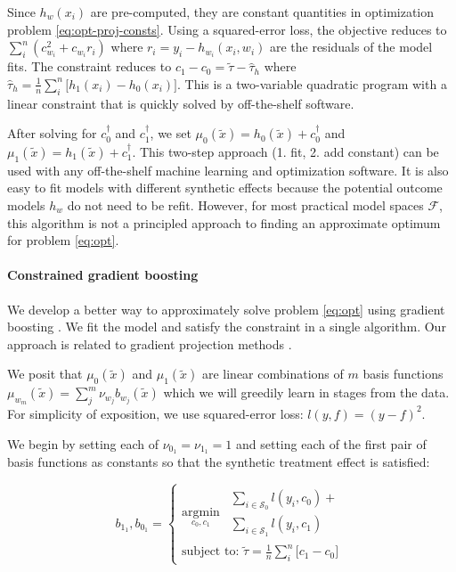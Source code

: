 Since $h_w(x_i)$ are pre-computed, they are constant quantities in optimization problem \ref{eq:opt-proj-consts}. Using a squared-error loss, the objective reduces to $\sum_i^n ( c_{w_i}^2 + c_{w_i}r_i)$ where $r_i= y_i - h_{w_i}(x_i,w_i)$ are the residuals of the model fits. The constraint reduces to $c_1-c_0 = \tilde{\tau} - \hat{\tau}_h$ where $\hat{\tau}_h = \frac{1}{n}\sum_i^n \big[h_1(x_i) - h_0(x_i)\big]$. This is a two-variable quadratic program with a linear constraint that is quickly solved by off-the-shelf software.

After solving for $c^\dagger_0$ and $c^\dagger_1$, we set $\mu_0(\tilde x ) = h_0(\tilde x) + c^\dagger_0$ and $\mu_1(\tilde x) = h_1(\tilde x) + c^\dagger_1$. This two-step approach (1. fit, 2. add constant) can be used with any off-the-shelf machine learning and optimization software. It is also easy to fit models with different synthetic effects because the potential outcome models $h_w$ do not need to be refit. However, for most practical model spaces $\mathcal{F}$, this algorithm is not a principled approach to finding an approximate optimum for problem \ref{eq:opt}.
 
\paragraph{Constrained gradient boosting}
We develop a better way to approximately solve problem \ref{eq:opt} using gradient boosting \cite{Friedman:2001ue}. We fit the model and satisfy the constraint in a single algorithm. Our approach is related to gradient projection methods \cite{Rosen:1961jl}.

We posit that $\mu_0(\tilde x)$ and $\mu_1(\tilde x)$ are linear combinations of $m$ basis functions $\mu_{w_m}(\tilde x) = \sum_j^m \nu_{w_j} b_{w_j}(\tilde x)$ which we will greedily learn in stages from the data. For simplicity of exposition, we use squared-error loss: $l(y,f) = (y-f)^2$.

We begin by setting each of $\nu_{0_1} = \nu_{1_1} = 1$ and setting each of the first pair of basis functions as constants so that the synthetic treatment effect is satisfied:

\begin{equation}
b_{1_1}, b_{0_1} =
\begin{cases}
\underset{c_0, c_1}{\text{argmin}} \ \ 
\begin{array}{l}
\sum_{i \in \mathcal{S}_0}  l(y_i, c_0) + \\
\sum_{i \in \mathcal{S}_1}  l(y_i, c_1) 
\end{array}\\
\text{subject to:   } \tilde{\tau} = \frac{1}{n}\sum_i^n \big[c_1 - c_0\big]
\end{cases}
\label{eq:first-opt}
\end{equation}

